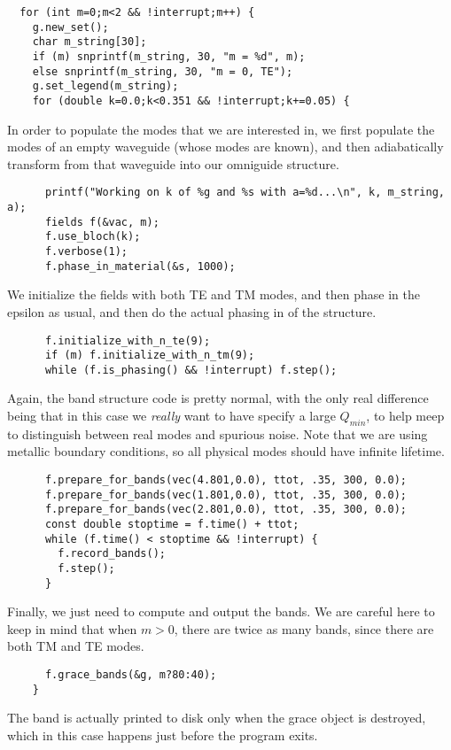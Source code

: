 \begin{verbatim}
  for (int m=0;m<2 && !interrupt;m++) {
    g.new_set();
    char m_string[30];
    if (m) snprintf(m_string, 30, "m = %d", m);
    else snprintf(m_string, 30, "m = 0, TE");
    g.set_legend(m_string);
    for (double k=0.0;k<0.351 && !interrupt;k+=0.05) {
\end{verbatim}
In order to populate the modes that we are interested in, we first populate
the modes of an empty waveguide (whose modes are known), and then
adiabatically transform from that waveguide into our omniguide structure.
\begin{verbatim}
      printf("Working on k of %g and %s with a=%d...\n", k, m_string, a);
      fields f(&vac, m);
      f.use_bloch(k);
      f.verbose(1);
      f.phase_in_material(&s, 1000);
\end{verbatim}
We initialize the fields with both TE and TM modes, and then phase in the
epsilon as usual, and then do the actual phasing in of the structure.
\begin{verbatim}
      f.initialize_with_n_te(9);
      if (m) f.initialize_with_n_tm(9);
      while (f.is_phasing() && !interrupt) f.step();
\end{verbatim}
Again, the band structure code is pretty normal, with the only real
difference being that in this case we \emph{really} want to have specify a
large $Q_{min}$, to help meep to distinguish between real modes and
spurious noise.  Note that we are using metallic boundary conditions, so
all physical modes should have infinite lifetime.
\begin{verbatim}
      f.prepare_for_bands(vec(4.801,0.0), ttot, .35, 300, 0.0);
      f.prepare_for_bands(vec(1.801,0.0), ttot, .35, 300, 0.0);
      f.prepare_for_bands(vec(2.801,0.0), ttot, .35, 300, 0.0);
      const double stoptime = f.time() + ttot;
      while (f.time() < stoptime && !interrupt) {
        f.record_bands();
        f.step();
      }
\end{verbatim}
Finally, we just need to compute and output the bands.  We are careful here
to keep in mind that when $m > 0$, there are twice as many bands, since
there are both TM and TE modes.
\begin{verbatim}
      f.grace_bands(&g, m?80:40);
    }
\end{verbatim}
The band is actually printed to disk only when the grace object is
destroyed, which in this case happens just before the program exits.
\begin{comment}
  }
}
\end{comment}